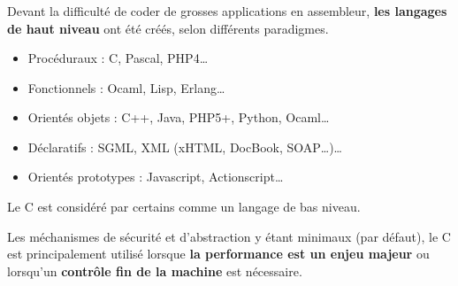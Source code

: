 \begin{frame}
  \frametitle{\secname}
  \framesubtitle{\subsecname}
  Devant la difficulté de coder de grosses applications en assembleur, \textbf{les langages de haut niveau} ont été créés, selon différents paradigmes.
  \begin{itemize}
    \item Procéduraux : C, Pascal, PHP4\ldots
    \item Fonctionnels : Ocaml, Lisp, Erlang\ldots
    \item Orientés objets : C++, Java, PHP5+, Python, Ocaml\ldots
    \item Déclaratifs : SGML, XML (xHTML, DocBook, SOAP\ldots)\ldots
    \item Orientés prototypes : Javascript, Actionscript\ldots
  \end{itemize}
  \par
  Le C est considéré par certains comme un langage de bas niveau. 
  \par
  Les méchanismes de sécurité et d'abstraction y étant minimaux (par défaut), le C est principalement utilisé lorsque \textbf{la performance est un enjeu majeur} ou 
  lorsqu'un \textbf{contrôle fin de la machine} est nécessaire.
\end{frame}

